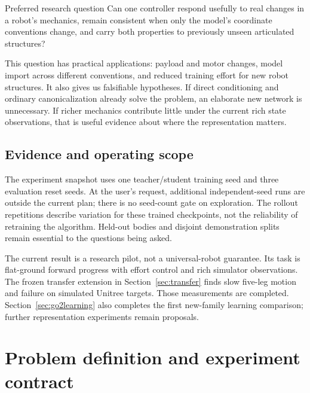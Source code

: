\documentclass[11pt,letterpaper]{article}
\begin{document}
\begin{finding}{Preferred research question}
Can one controller respond usefully to real changes in a robot's mechanics,
remain consistent when only the model's coordinate conventions change, and carry
both properties to previously unseen articulated structures?
\end{finding}

This question has practical applications: payload and motor changes, model import
across different conventions, and reduced training effort for new robot
structures. It also gives us falsifiable hypotheses. If direct conditioning and
ordinary canonicalization already solve the problem, an elaborate new network is
unnecessary. If richer mechanics contribute little under the current rich state
observations, that is useful evidence about where the representation matters.

\subsection{Evidence and operating scope}
The experiment snapshot uses one teacher/student training seed and three
evaluation reset seeds. At the user's request, additional independent-seed runs
are outside the current plan; there is no seed-count gate on exploration. The
rollout repetitions describe variation for these trained checkpoints, not the
reliability of retraining the algorithm. Held-out bodies and disjoint demonstration
splits remain essential to the questions being asked.

The current result is a research pilot, not a universal-robot guarantee. Its task
is flat-ground forward progress with effort control and rich simulator
observations. The frozen transfer extension in Section~\ref{sec:transfer} finds
slow five-leg motion and failure on simulated Unitree targets. Those measurements
are completed. Section~\ref{sec:go2learning} also completes the first new-family
learning comparison; further representation experiments remain proposals.

\section{Problem definition and experiment contract}
\label{sec:problem}
\end{document}
